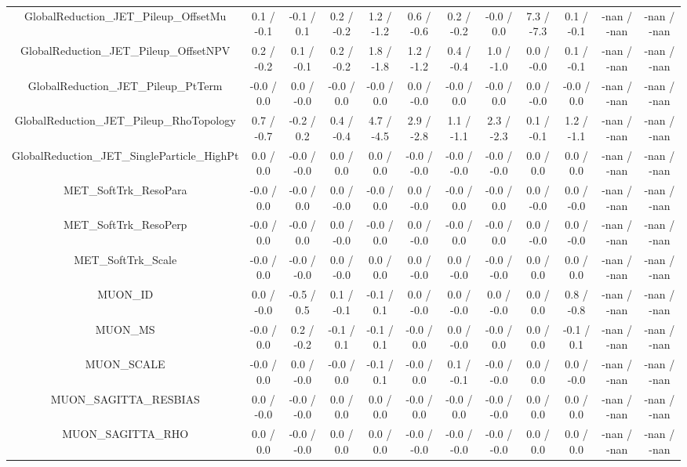 \begin{table}[htbp]
\begin{center}
\begin{tabular}{|c|c|c|c|c|c|c|c|c|c|c|c|}
  GlobalReduction_JET_Pileup_OffsetMu & 0.1 / -0.1 & -0.1 / 0.1 & 0.2 / -0.2 & 1.2 / -1.2 & 0.6 / -0.6 & 0.2 / -0.2 & -0.0 / 0.0 & 7.3 / -7.3 & 0.1 / -0.1 & -nan / -nan & -nan / -nan \\ 
  GlobalReduction_JET_Pileup_OffsetNPV & 0.2 / -0.2 & 0.1 / -0.1 & 0.2 / -0.2 & 1.8 / -1.8 & 1.2 / -1.2 & 0.4 / -0.4 & 1.0 / -1.0 & 0.0 / -0.0 & 0.1 / -0.1 & -nan / -nan & -nan / -nan \\ 
  GlobalReduction_JET_Pileup_PtTerm & -0.0 / 0.0 & 0.0 / -0.0 & -0.0 / 0.0 & -0.0 / 0.0 & 0.0 / -0.0 & -0.0 / 0.0 & -0.0 / 0.0 & 0.0 / -0.0 & -0.0 / 0.0 & -nan / -nan & -nan / -nan \\ 
  GlobalReduction_JET_Pileup_RhoTopology & 0.7 / -0.7 & -0.2 / 0.2 & 0.4 / -0.4 & 4.7 / -4.5 & 2.9 / -2.8 & 1.1 / -1.1 & 2.3 / -2.3 & 0.1 / -0.1 & 1.2 / -1.1 & -nan / -nan & -nan / -nan \\ 
  GlobalReduction_JET_SingleParticle_HighPt & 0.0 / 0.0 & -0.0 / -0.0 & 0.0 / 0.0 & 0.0 / 0.0 & -0.0 / -0.0 & -0.0 / -0.0 & -0.0 / -0.0 & 0.0 / 0.0 & 0.0 / 0.0 & -nan / -nan & -nan / -nan \\ 
  MET_SoftTrk_ResoPara & -0.0 / 0.0 & -0.0 / 0.0 & 0.0 / -0.0 & -0.0 / 0.0 & 0.0 / -0.0 & -0.0 / 0.0 & -0.0 / 0.0 & 0.0 / -0.0 & 0.0 / -0.0 & -nan / -nan & -nan / -nan \\ 
  MET_SoftTrk_ResoPerp & -0.0 / 0.0 & -0.0 / 0.0 & 0.0 / -0.0 & -0.0 / 0.0 & 0.0 / -0.0 & -0.0 / 0.0 & -0.0 / 0.0 & 0.0 / -0.0 & 0.0 / -0.0 & -nan / -nan & -nan / -nan \\ 
  MET_SoftTrk_Scale & -0.0 / 0.0 & -0.0 / -0.0 & 0.0 / -0.0 & 0.0 / 0.0 & 0.0 / -0.0 & 0.0 / -0.0 & -0.0 / -0.0 & 0.0 / 0.0 & 0.0 / 0.0 & -nan / -nan & -nan / -nan \\ 
  MUON_ID & 0.0 / -0.0 & -0.5 / 0.5 & 0.1 / -0.1 & -0.1 / 0.1 & 0.0 / -0.0 & 0.0 / -0.0 & 0.0 / -0.0 & 0.0 / 0.0 & 0.8 / -0.8 & -nan / -nan & -nan / -nan \\ 
  MUON_MS & -0.0 / 0.0 & 0.2 / -0.2 & -0.1 / 0.1 & -0.1 / 0.1 & -0.0 / 0.0 & 0.0 / -0.0 & -0.0 / 0.0 & 0.0 / 0.0 & -0.1 / 0.1 & -nan / -nan & -nan / -nan \\ 
  MUON_SCALE & -0.0 / 0.0 & 0.0 / -0.0 & -0.0 / 0.0 & -0.1 / 0.1 & -0.0 / 0.0 & 0.1 / -0.1 & -0.0 / -0.0 & 0.0 / 0.0 & 0.0 / -0.0 & -nan / -nan & -nan / -nan \\ 
  MUON_SAGITTA_RESBIAS & 0.0 / -0.0 & -0.0 / -0.0 & 0.0 / 0.0 & 0.0 / 0.0 & -0.0 / 0.0 & -0.0 / 0.0 & -0.0 / -0.0 & 0.0 / 0.0 & 0.0 / 0.0 & -nan / -nan & -nan / -nan \\ 
  MUON_SAGITTA_RHO & 0.0 / 0.0 & -0.0 / -0.0 & 0.0 / 0.0 & 0.0 / 0.0 & -0.0 / -0.0 & -0.0 / -0.0 & -0.0 / -0.0 & 0.0 / 0.0 & 0.0 / 0.0 & -nan / -nan & -nan / -nan \\ 

\end{tabular}
\end{center}
\end{table}
